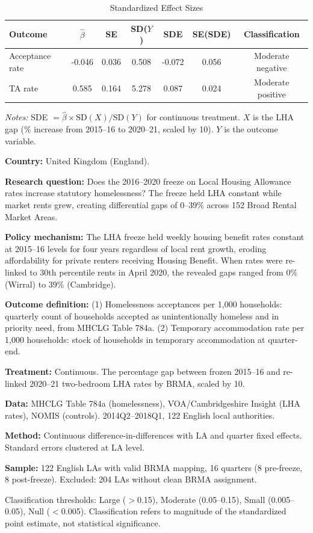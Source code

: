 \begin{table}[t]
\centering
\caption{Standardized Effect Sizes}
\label{tab:sde}
\begin{tabular}{lcccccc}
\hline\hline
Outcome & $\hat{\beta}$ & SE & SD($Y$) & SDE & SE(SDE) & Classification \\
\hline
Acceptance rate & -0.046 & 0.036 & 0.508 & -0.072 & 0.056 & Moderate negative \\
TA rate & 0.585 & 0.164 & 5.278 & 0.087 & 0.024 & Moderate positive \\
\hline\hline
\end{tabular}
\begin{tablenotes}
\small
\item \textit{Notes:} SDE $= \hat{\beta} \times \text{SD}(X) / \text{SD}(Y)$ for continuous treatment. $X$ is the LHA gap (\% increase from 2015--16 to 2020--21, scaled by 10). $Y$ is the outcome variable.
\item \textbf{Country:} United Kingdom (England).
\item \textbf{Research question:} Does the 2016--2020 freeze on Local Housing Allowance rates increase statutory homelessness? The freeze held LHA constant while market rents grew, creating differential gaps of 0--39\% across 152 Broad Rental Market Areas.
\item \textbf{Policy mechanism:} The LHA freeze held weekly housing benefit rates constant at 2015--16 levels for four years regardless of local rent growth, eroding affordability for private renters receiving Housing Benefit. When rates were re-linked to 30th percentile rents in April 2020, the revealed gaps ranged from 0\% (Wirral) to 39\% (Cambridge).
\item \textbf{Outcome definition:} (1) Homelessness acceptances per 1,000 households: quarterly count of households accepted as unintentionally homeless and in priority need, from MHCLG Table 784a. (2) Temporary accommodation rate per 1,000 households: stock of households in temporary accommodation at quarter-end.
\item \textbf{Treatment:} Continuous. The percentage gap between frozen 2015--16 and re-linked 2020--21 two-bedroom LHA rates by BRMA, scaled by 10.
\item \textbf{Data:} MHCLG Table 784a (homelessness), VOA/Cambridgeshire Insight (LHA rates), NOMIS (controls). 2014Q2--2018Q1, 122 English local authorities.
\item \textbf{Method:} Continuous difference-in-differences with LA and quarter fixed effects. Standard errors clustered at LA level.
\item \textbf{Sample:} 122 English LAs with valid BRMA mapping, 16 quarters (8 pre-freeze, 8 post-freeze). Excluded: 204 LAs without clean BRMA assignment.
\item Classification thresholds: Large ($>$0.15), Moderate (0.05--0.15), Small (0.005--0.05), Null ($<$0.005). Classification refers to magnitude of the standardized point estimate, not statistical significance.
\end{tablenotes}
\end{table}
